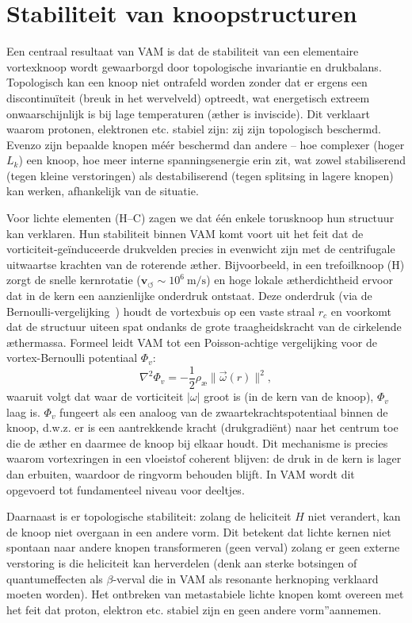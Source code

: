 \section{Stabiliteit van knoopstructuren}

Een centraal resultaat van VAM is dat de stabiliteit van een elementaire vortexknoop wordt gewaarborgd door topologische invariantie en drukbalans. Topologisch kan een knoop niet ontrafeld worden zonder dat er ergens een discontinuïteit (breuk in het wervelveld) optreedt, wat energetisch extreem onwaarschijnlijk is bij lage temperaturen (æther is inviscide). Dit verklaart waarom protonen, elektronen etc. stabiel zijn: zij zijn topologisch beschermd. Evenzo zijn bepaalde knopen méér beschermd dan andere – hoe complexer (hoger $L_k$) een knoop, hoe meer interne spanningsenergie erin zit, wat zowel stabiliserend (tegen kleine verstoringen) als destabiliserend (tegen splitsing in lagere knopen) kan werken, afhankelijk van de situatie.

Voor lichte elementen (H–C) zagen we dat één enkele torusknoop hun structuur kan verklaren. Hun stabiliteit binnen VAM komt voort uit het feit dat
de vorticiteit-geïnduceerde drukvelden precies in evenwicht zijn met de centrifugale uitwaartse krachten van de roterende æther. Bijvoorbeeld, in een trefoilknoop (H) zorgt de snelle kernrotatie ($\mathbf{v}_{\scriptscriptstyle\boldsymbol{\circlearrowleft}} \sim10^6~\text{m/s}$) en hoge lokale ætherdichtheid ervoor dat in de kern een aanzienlijke onderdruk ontstaat. Deze onderdruk (via de Bernoulli-vergelijking~\cite{Ricca1992EnergyHelicity}) houdt de vortexbuis op een vaste straal $r_c$ en voorkomt dat de structuur uiteen spat ondanks de grote traagheidskracht van de cirkelende æthermassa. Formeel leidt VAM tot een Poisson-achtige vergelijking voor de vortex-Bernoulli potentiaal $\Phi_v$:
\begin{equation}
    \nabla^2 \Phi_v = -\frac{1}{2}\rho_\text{\ae} \| \vec{\omega}(r) \|^2,
\end{equation}
waaruit volgt dat waar de vorticiteit $|\omega|$ groot is (in de kern van de knoop), $\Phi_v$ laag is. $\Phi_v$ fungeert als een analoog van de zwaartekrachtspotentiaal binnen de knoop, d.w.z. er is een aantrekkende kracht (drukgradiënt) naar het centrum toe die de æther en daarmee de knoop bij elkaar houdt. Dit mechanisme is precies waarom vortexringen in een vloeistof coherent blijven: de druk in de kern is lager dan erbuiten, waardoor de ringvorm behouden blijft. In VAM wordt dit opgevoerd tot fundamenteel niveau voor deeltjes.

Daarnaast is er topologische stabiliteit: zolang de heliciteit $H$ niet verandert, kan de knoop niet overgaan in een andere vorm. Dit betekent dat lichte kernen niet spontaan naar andere knopen transformeren (geen verval) zolang er geen externe verstoring is die heliciteit kan herverdelen (denk aan sterke botsingen of quantumeffecten als $\beta$-verval die in VAM als resonante herknoping verklaard moeten worden). Het ontbreken van metastabiele lichte knopen komt overeen met het feit dat proton, elektron etc. stabiel zijn en geen \grqq andere vorm\textquotedblright aannemen.